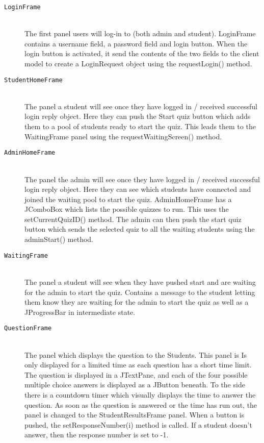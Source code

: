 \begin{description}
\begin{description}
		\item[\texttt{LoginFrame}]\hfill \\ The first panel users will log-in to 
			(both admin and student). LoginFrame contains a username field, 
			a password field and login button. When the login button is 
			activated, it send the contents of the two fields to the client 
			model to create a LoginRequest object using the requestLogin() 
			method.

		\item[\texttt{StudentHomeFrame}]\hfill \\ The panel a student will see 
			once they have logged in / received successful login reply 
			object. Here they can push the Start quiz button which adds them 
			to a pool of students ready to start the quiz. This leads them 
			to the WaitingFrame panel using the requestWaitingScreen() 
			method.

		\item[\texttt{AdminHomeFrame}]\hfill \\ The panel the admin will see 
			once they have logged in / received successful login reply 
			object. Here they can see which students have connected and 
			joined the waiting pool to start the quiz. AdminHomeFrame has a 
			JComboBox which lists the possible quizzes to run. This uses the 
			setCurrentQuizID() method. The admin can then push the start 
			quiz button which sends the selected quiz to all the waiting 
			students using the adminStart() method.

		\item[\texttt{WaitingFrame}]\hfill \\ The panel a student will see when 
			they have pushed start and are waiting for the admin to start 
			the quiz. Contains a message to the student letting them know 
			they are waiting for the admin to start the quiz as well as a 
			JProgressBar in intermediate state.
		
		\item[\texttt{QuestionFrame}]\hfill \\ The panel which displays the 	
			question to the Students. This panel is Is only displayed for a 
			limited time as each question has a short time limit. The 
			question is displayed in a JTextPane, and each of the four 
			possible multiple choice answers is displayed as a JButton 
			beneath. To the side there is a countdown timer which visually 
			displays the time to answer the question. As soon as the 
			question is answered or the time has run out, the panel is 
			changed to the StudentResultsFrame panel. When a button is 
			pushed, the setResponseNumber(i) method is called. If a student 
			doesn't answer, then the response number is set to -1.


\end{description}
\end{description}
